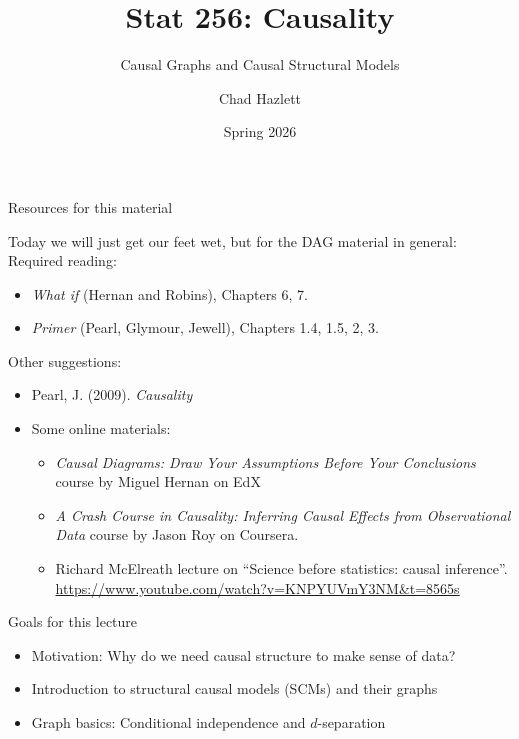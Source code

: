 \documentclass[xcolor=dvipsnames]{beamer}
\title{Stat 256: Causality}
\date{Spring 2026}
\subtitle[ ]{Causal Graphs and Causal Structural Models}
\author{Chad Hazlett}
\institute[UCLA]{UCLA\\[1ex]
  \texttt{chazlett@ucla.edu}}
\begin{document}
\subject{Talks}


\begin{frame}
  \titlepage
\end{frame}

\begin{frame}{Resources for this material}

 Today we will just get our feet wet, but for the DAG material in general:\\
\bigskip
{} Required reading:\\
\begin{itemize}
\item  \textit{What if} (Hernan and Robins), Chapters 6, 7.
\item  \textit{Primer} (Pearl, Glymour, Jewell), Chapters 1.4, 1.5, 2, 3.
\end{itemize}

 Other suggestions:\\
\begin{itemize}
\item  Pearl, J. (2009).  \textit{Causality} \\
\item<3-> Some online materials:\\
\begin{itemize}
\item \textit{Causal Diagrams: Draw Your Assumptions Before Your Conclusions} course by Miguel Hernan on EdX
\item \textit{A Crash Course in Causality: Inferring Causal Effects from Observational Data} course by Jason Roy on Coursera.
\item Richard McElreath lecture on ``Science before statistics: causal inference''. \url{https://www.youtube.com/watch?v=KNPYUVmY3NM&t=8565s}
\end{itemize}
\end{itemize}
\end{frame}

\begin{frame}{Goals for this lecture}
\begin{itemize}
\item<1-> Motivation: Why do we need causal structure to make sense of data?
\bigskip
\item<2-> Introduction to structural causal models (SCMs) and their graphs
\bigskip
\item<3-> Graph basics: Conditional independence and $d$-separation
\end{itemize}
\end{frame}
\end{document}
